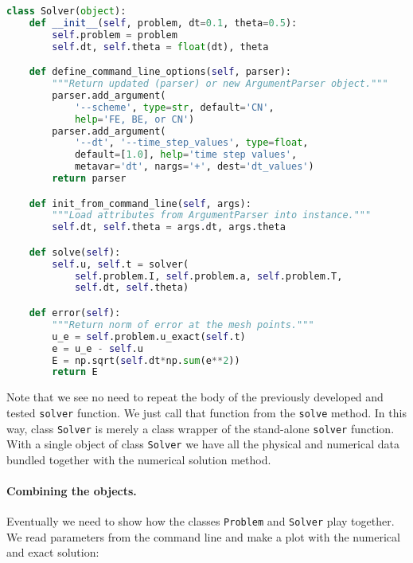 \documentclass[graybox,sectrefs,envcountresetchap,open=right,final]{svmonodo}
\begin{document}
\begin{lstlisting}[language=python,style=blue1_bluegreen]
class Solver(object):
    def __init__(self, problem, dt=0.1, theta=0.5):
        self.problem = problem
        self.dt, self.theta = float(dt), theta

    def define_command_line_options(self, parser):
        """Return updated (parser) or new ArgumentParser object."""
        parser.add_argument(
            '--scheme', type=str, default='CN',
            help='FE, BE, or CN')
        parser.add_argument(
            '--dt', '--time_step_values', type=float,
            default=[1.0], help='time step values',
            metavar='dt', nargs='+', dest='dt_values')
        return parser

    def init_from_command_line(self, args):
        """Load attributes from ArgumentParser into instance."""
        self.dt, self.theta = args.dt, args.theta

    def solve(self):
        self.u, self.t = solver(
            self.problem.I, self.problem.a, self.problem.T,
            self.dt, self.theta)

    def error(self):
        """Return norm of error at the mesh points."""
        u_e = self.problem.u_exact(self.t)
        e = u_e - self.u
        E = np.sqrt(self.dt*np.sum(e**2))
        return E

\end{lstlisting}

Note that we see no need to repeat the body of the previously
developed and tested \texttt{solver} function. We just call that function from
the \texttt{solve} method.  In this way, class \texttt{Solver} is merely a class wrapper
of the stand-alone \texttt{solver} function. With a single object of class \texttt{Solver}
we have all the physical and numerical data bundled together with the numerical
solution method.

\paragraph{Combining the objects.}
Eventually we need to show how the classes \texttt{Problem} and \texttt{Solver}
play together. We read parameters from the command line and make a
plot with the numerical and exact solution:
\end{document}
